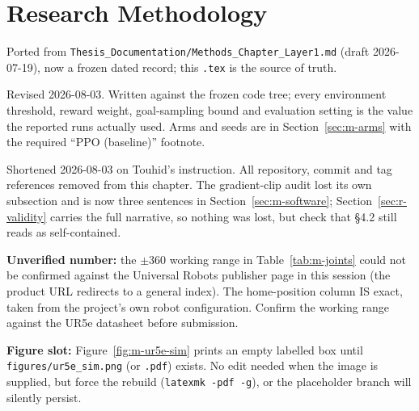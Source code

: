 \chapter{Research Methodology}\label{ch:methods}

\begin{draftnote}
Ported from \texttt{Thesis\_Documentation/Methods\_Chapter\_Layer1.md} (draft 2026-07-19), now a
frozen dated record; this \texttt{.tex} is the source of truth.

Revised 2026-08-03. Written against the frozen code tree; every environment threshold, reward
weight, goal-sampling bound and evaluation setting is the value the reported runs actually used.
Arms and seeds are in Section~\ref{sec:m-arms} with the required ``PPO (baseline)'' footnote.

Shortened 2026-08-03 on Touhid's instruction. All repository, commit and tag references removed
from this chapter. The gradient-clip audit lost its own subsection and is now three sentences in
Section~\ref{sec:m-software}; Section~\ref{sec:r-validity} carries the full narrative, so nothing
was lost, but check that \S4.2 still reads as self-contained.

\textbf{Unverified number:} the \(\pm\)360\textdegree{} working range in Table~\ref{tab:m-joints} could
not be confirmed against the Universal Robots publisher page in this session (the product URL
redirects to a general index). The home-position column IS exact, taken from the project's own robot
configuration. Confirm the working range against the UR5e datasheet before submission.

\textbf{Figure slot:} Figure~\ref{fig:m-ur5e-sim} prints an empty labelled box until
\texttt{figures/ur5e\_sim.png} (or \texttt{.pdf}) exists. No edit needed when the image is supplied,
but force the rebuild (\texttt{latexmk -pdf -g}), or the placeholder branch will silently persist.
\end{draftnote}

\newenvironment{keypoints}{\par\addvspace{10pt}\noindent\textbf{Key points}\par\nopagebreak}%
  {\par\addvspace{10pt}}


